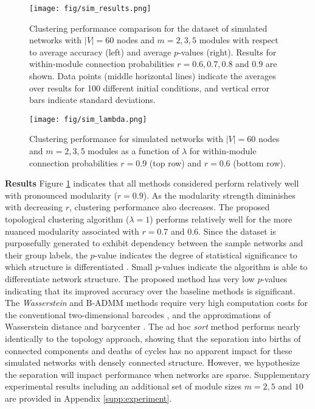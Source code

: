 \documentclass{article} %
\begin{document}
\begin{figure}
\centering
\texttt{[image: fig/sim\_results.png]}
\caption{Clustering performance comparison for the dataset of simulated networks with $|V|=60$ nodes and $m = 2, 3, 5$ modules with respect to average accuracy (left) and average $p$-values (right). Results for within-module connection probabilities $r = 0.6,0.7,0.8$ and $0.9$ are shown. Data points (middle horizontal lines) indicate the averages over results for 100 different initial conditions, and vertical error bars indicate standard deviations.}
\label{fig:validation}
\end{figure}


\begin{wrapfigure}{R}{0.45\textwidth}
\vspace{-15pt}
\centering
\texttt{[image: fig/sim\_lambda.png]}
\vspace{-15pt}
\caption{\small Clustering performance for simulated networks with $|V|=60$ nodes and $m=2,3,5$ modules as a function of $\lambda$ for within-module connection probabilities $r=0.9$ (top row) and $r=0.6$ (bottom row).
}
\vspace{-15pt}
\label{fig:sim_lambda}
\end{wrapfigure}


\textbf{Results}
Figure \ref{fig:validation} indicates that all methods considered perform relatively well with pronounced modularity ($r = 0.9$). As the modularity strength diminishes with decreasing $r$, clustering performance also decreases. The proposed topological clustering algorithm ($\lambda=1$) performs relatively well for the more nuanced modularity associated with $r = 0.7$ and $0.6$.
Since the dataset is purposefully generated to exhibit dependency between the sample networks and their group labels, the $p$-value indicates the degree of statistical significance to which structure is differentiated \citep{ojala2010permutation}.
Small $p$-values indicate the algorithm is able to differentiate network structure. The proposed method has very low $p$-values indicating that its improved accuracy over the baseline methods is significant.
The {\em Wasserstein} and B-ADMM methods require very high computation costs for the conventional two-dimensional barcodes \citep{otter2017roadmap}, and the approximations of Wasserstein distance \citep{Lacombe2018LargeSC} and barycenter \citep{ye2017fast}.
The ad hoc {\em sort} method performs nearly identically to the topology approach, showing that the separation into births of connected components and deaths of cycles has no apparent impact for these simulated networks with densely connected structure. However, we hypothesize the separation will impact performance when networks are sparse. Supplementary experimental results including an additional set of module sizes $m=2,5$ and $10$ are provided in Appendix \ref{supp:experiment}.
\end{document}
